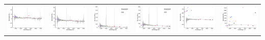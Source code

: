\begin{center}
\begin{longtable}{l l l l l l }
    \includegraphics[width=0.3\linewidth, clip]{Figs/Figs-lamost/spec-56656-HD120800N003716M01_sp04-046-SPLUS-n02n24-020916.pdf} & \includegraphics[width=0.3\linewidth, clip]{Figs/Figs-lamost/spec-56656-HD120800N003716M01_sp14-201-SPLUS-n02n23-022190.pdf} & \includegraphics[width=0.3\linewidth, clip]{Figs/Figs-lamost/spec-56741-HD115451S012705B_sp01-058-SPLUS-n03s21-009182.pdf} & \includegraphics[width=0.3\linewidth, clip]{Figs/Figs-lamost/spec-56741-HD115451S012705B_sp07-217-SPLUS-n03s23-001039.pdf} & \includegraphics[width=0.3\linewidth, clip]{Figs/Figs-lamost/spec-56741-HD115451S012705B_sp11-044-SPLUS-n02n22-000168.pdf} & \includegraphics[width=0.3\linewidth, clip]{Figs/Figs-lamost/spec-56741-HD115451S012705B_sp13-174-SPLUS-n02s22-039680.pdf} \\

\end{longtable}
\end{center}

